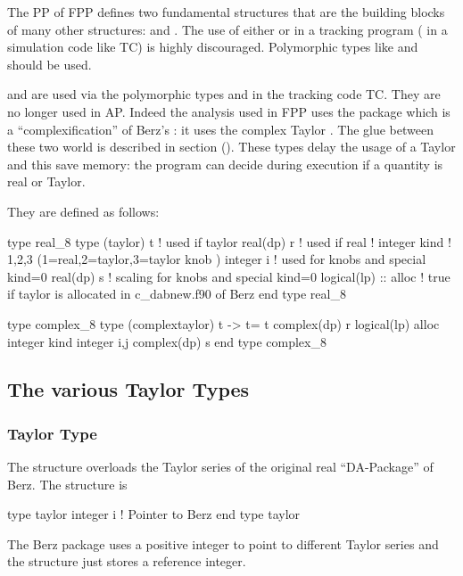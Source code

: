 \documentclass{hitec}     %
\begin{document}
{{The PP of FPP defines two fundamental structures that are the building blocks of many other structures:
 and . The  use of either  or   in a tracking program (
in a  simulation code like  TC) is highly discouraged. Polymorphic types like  and 
should be used.

  and  are used  via the polymorphic types  and  in the tracking code TC. They are no longer used in AP. Indeed the analysis used in FPP uses the package  which is a ``complexification'' of Berz's : it uses the complex Taylor . The glue between these two world is described in section (). These types delay the usage of a Taylor and this save memory: the program can decide during execution if a quantity is real or Taylor.
 


 
 
 They are defined as follows:
 
 \begin{code}
type real_8
 type (taylor) t ! used if taylor
 real(dp) r ! used if real
!
 integer kind !  1,2,3 (1=real,2=taylor,3=taylor knob )
 integer i ! used for knobs and special kind=0
 real(dp) s ! scaling for knobs and special kind=0
 logical(lp) :: alloc ! true if taylor is allocated in c_dabnew.f90 of Berz  
end type real_8

  
type complex_8
 type (complextaylor) t    -> t= t%
 complex(dp) r
 logical(lp) alloc
 integer kind
 integer i,j
 complex(dp) s
end type complex_8
 \end{code}
 
 \subsection{The various Taylor Types}
\label{s:taylorc}

\subsubsection{Taylor Type}
\label{s:taylor}

The  structure overloads the Taylor series of the original real ``DA-Package'' of
Berz.  The structure is
\begin{code}
type taylor
   integer i    ! Pointer to Berz
end type taylor
\end{code}
The Berz package  uses a positive integer to point to different Taylor series and the
 structure just stores a reference integer.

}}
\end{document}
